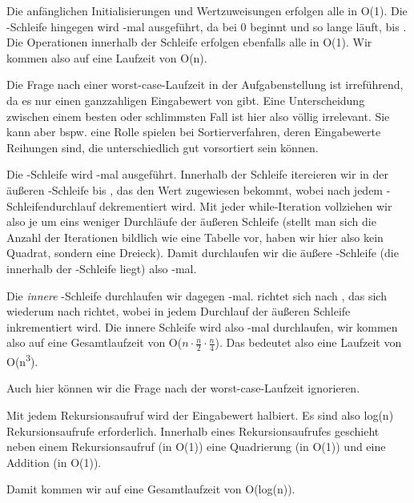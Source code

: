 \newpage
\begin{aufgabe}%
\begin{teile}

	\item
	Die anfänglichen Initialisierungen und Wertzuweisungen erfolgen alle in O(1). Die -Schleife hingegen wird -mal ausgeführt, da  bei 0 beginnt und so lange läuft, bis . Die Operationen innerhalb der Schleife erfolgen ebenfalls alle in O(1).	Wir kommen also auf eine Laufzeit von O(n).
	
	Die Frage nach einer \glqq worst-case\grqq -Laufzeit in der Aufgabenstellung ist irreführend, da es nur einen ganzzahligen Eingabewert von  gibt. Eine Unterscheidung zwischen einem besten oder schlimmsten Fall ist hier also völlig irrelevant. Sie kann aber bspw. eine Rolle spielen bei Sortierverfahren, deren Eingabewerte Reihungen sind, die unterschiedlich gut vorsortiert sein können. \\

	\item
	Die -Schleife wird -mal ausgeführt. Innerhalb der Schleife itereieren wir in der äußeren -Schleife bis , das den Wert  zugewiesen bekommt, wobei  nach jedem -Schleifendurchlauf dekrementiert wird. Mit jeder while-Iteration vollziehen wir also je um eins weniger Durchläufe der äußeren Schleife (stellt man sich die Anzahl der Iterationen bildlich wie eine Tabelle vor, haben wir hier also kein Quadrat, sondern eine Dreieck). Damit durchlaufen wir die äußere -Schleife (die innerhalb der -Schleife liegt) also -mal.
	
	Die \textit{innere} -Schleife durchlaufen wir dagegen -mal.  richtet sich nach , das sich wiederum nach  richtet, wobei  in jedem Durchlauf der äußeren Schleife inkrementiert wird. Die innere Schleife wird also -mal durchlaufen, wir kommen also auf eine Gesamtlaufzeit von O($n \cdot \frac{n}{2} \cdot \frac{n}{4}$). Das bedeutet also eine Laufzeit von O(n\textsuperscript{3}).
	
	
	Auch hier können wir die Frage nach der \glqq worst-case\grqq -Laufzeit ignorieren. \\
	 
	\item
	Mit jedem Rekursionsaufruf wird der Eingabewert halbiert. Es sind also log(n) Rekursionsaufrufe erforderlich. Innerhalb eines Rekursionsaufrufes geschieht neben einem Rekursionsaufruf (in O(1)) eine Quadrierung (in O(1)) und eine Addition (in O(1)).
	
	Damit kommen wir auf eine Gesamtlaufzeit von O(log(n)).

\end{teile}	
\end{aufgabe}


